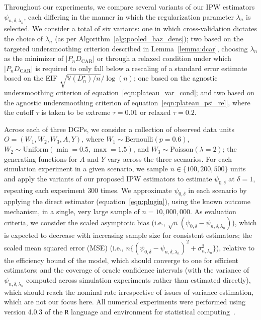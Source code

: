 Throughout our experiments, we compare several variants of our IPW estimators
$\psi_{n,\delta,\lambda_n}$, each differing in the manner in which the
regularization parameter $\lambda_n$ is selected. We consider a total of six
variants: one in which cross-validation dictates the choice of $\lambda_n$ (as
per Algorithm~\ref{alg:pooled_haz_dens}); two based on the targeted
undersmoothing criterion described in Lemma~\ref{lemma:dcar}, choosing
$\lambda_n$ as the minimizer of $\lvert P_n D_\text{CAR} \rvert$ or through
a relaxed condition under which $\lvert P_n D_\text{CAR} \rvert$ is required to
only fall below a rescaling of a standard error estimate based on the EIF
$\sqrt{\mathbb{V}(D^{\star}_n) / n}/ \log(n)$; one based on the agnostic
undersmoothing criterion of equation~\ref{eqn:plateau_var_cond}; and two based
on the agnostic undersmoothing criterion of equation~\ref{eqn:plateau_psi_rel},
where the cutoff $\tau$ is taken to be extreme $\tau = 0.01$ or relaxed $\tau
= 0.2$.

Across each of three DGPs, we consider a collection of observed data units $O
= (W_1, W_2, W_3, \allowbreak A, Y)$, where $W_1 \sim \text{Bernoulli}(p
= 0.6)$, $W_2 \sim \text{Uniform}(\min = 0.5, \max = 1.5)$, and $W_3 \sim
\text{Poisson}(\lambda = 2)$; the generating functions for $A$ and $Y$ vary
across the three scenarios. For each simulation experiment in a given scenario,
we sample $n \in \{100, 200, 500\}$ units and apply the variants of our proposed
IPW estimators to estimate $\psi_{0,\delta}$ at $\delta = 1$, repeating each
experiment $300$ times. We approximate $\psi_{0,\delta}$ in each scenario by
applying the direct estimator (equation~\ref{eqn:plugin}), using the known
outcome mechanism, in a single, very large sample of $n = 10,000,000$. As
evaluation criteria, we consider the scaled asymptotic bias (i.e.,
$\sqrt{n}(\psi_{0,\delta} - \psi_{n,\delta,\lambda_n})$), which is expected to
decrease with increasing sample size for consistent estimators; the scaled mean
squared error (MSE) (i.e., $n \{(\psi_{0,\delta} - \psi_{n,\delta,\lambda_n})^2
+ \sigma_{n,\lambda_n}^2\}$), relative to the efficiency bound of the model,
which should converge to one for efficient estimators; and the coverage of
oracle confidence intervals (with the variance of $\psi_{n,\delta,\lambda_n}$
computed across simulation experiments rather than estimated directly), which
should reach the nominal rate irrespective of issues of variance estimation,
which are not our focus here. All numerical experiments were performed using
version 4.0.3 of the \texttt{R} language and environment for statistical
computing~\citep{R}.

